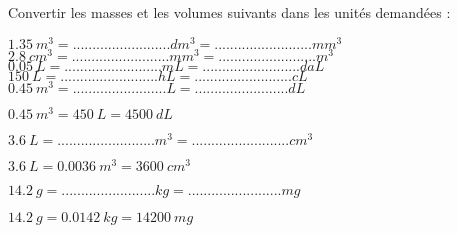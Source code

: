 
Convertir les masses et les volumes suivants dans les unités demandées :\\
\begin{questions}

	
	
		\question $ \num{1.35}\ m^3 =  ......................... dm^3 = ......................... mm^3 $\\
		
		\question $ \num{2.8}\ cm^3 =  ......................... mm^3 = ......................... m^3 $\\
		
		\question $ \num{0.05}\ L =  .........................  mL = ......................... daL $\\
		
		\question $ \num{150}\ L =  .........................  hL = ......................... cL $\\
		
		
			
	
		
		\question $ \num{0.45}\  m^3 =........................L =........................dL  $\\
		\begin{solution}
			$ \num{0.45}\  m^3 = \num{450}\  L = \num{4500}\  dL $
		\end{solution}
	
			\question $ \num{3.6}\  L =  ......................... m^3 = .........................cm^3 $\\
		\begin{solution}
			$ \num{3.6}\  L =  \num{0.0036}\  m^3 = \num{3600}\  cm^3 $
		\end{solution}
		
		
		
		
		\question $\num{14.2}\  g =........................kg =........................mg $\\
		\begin{solution}
			$ \num{14.2}\  g = \num{0.0142}\  kg = \num{14200}\  mg $
		\end{solution}
		

\end{questions}
